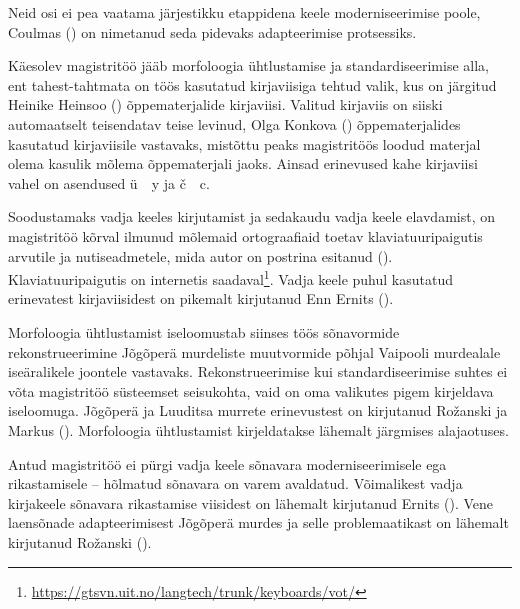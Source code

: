 \documentclass[12pt,a4paper]{article}
\begin{document}
Neid osi ei pea vaatama järjestikku etappidena keele moderniseerimise poole, Coulmas (\citeyear{coulmas_language_1989}) on nimetanud seda pidevaks adapteerimise protsessiks.

Käesolev magistritöö jääb morfoloogia ühtlustamise ja standardiseerimise alla, ent tahest-tahtmata on töös kasutatud kirjaviisiga tehtud valik, kus on järgitud Heinike Heinsoo (\citeyear{heinsoo_vadsonakopittoja_2015}) õppe\-materjalide kirjaviisi. Valitud kirjaviis on siiski automaatselt teisendatav teise levinud, Olga Konkova (\citeyear{konkova_vaddceeli_2014}) õppematerjalides kasutatud kirja\-viisile vastavaks, mis\-tõttu peaks magistri\-töös loodud materjal olema kasulik mõlema õppe\-materjali jaoks. Ainsad erinevused kahe kirja\-viisi vahel on asendused ü~\textrightarrow~y ja č~\textrightarrow~c. %

Soodustamaks vadja keeles kirjutamist ja seda\-kaudu vadja keele elavdamist, on magistritöö kõrval ilmunud mõlemaid ortograafiaid toetav klaviatuuri\-paigutis arvutile ja nuti\-seadmetele, mida autor on postrina esitanud (\cite[41]{toth_folklore_2019}). Klaviatuuri\-paigutis on internetis saadaval\footnote{\url{https://gtsvn.uit.no/langtech/trunk/keyboards/vot/}}. Vadja keele puhul kasutatud erinevatest kirjaviisidest on pikemalt kirjutanud Enn Ernits (\citeyear{ernits_vadja_2010}).

Morfoloogia ühtlustamist iseloomustab siinses töös sõnavormide rekonstrueerimine Jõgõperä murdeliste muutvormide põhjal Vaipooli murdealale iseäralikele joontele vastavaks. Rekonstrueerimise kui standardiseerimise suhtes ei võta magistri\-töö süsteemset seisukohta, vaid on oma valikutes pigem kirjeldava iseloomuga. Jõgõperä ja Luuditsa murrete erinevustest on kirjutanud Rožanski ja Markus (\citeyear{rozhanskiy_dialectal_2015}). Morfoloogia ühtlustamist kirjeldatakse lähemalt järgmises alajaotuses.

Antud magistritöö ei pürgi vadja keele sõnavara moderniseerimisele ega rikastamisele -- hõlmatud sõnavara on varem avaldatud. Võimalikest vadja kirja\-keele sõnavara rikastamise viisidest on lähemalt kirjutanud Ernits (\citeyear{ernits_vadja_2010}). 
Vene laensõnade adapteerimisest Jõgõperä murdes ja selle problemaatikast on lähemalt kirjutanud Rožanski (\citeyear{rozhanskiy_zaimstvovannyje_2009}).
\end{document}
